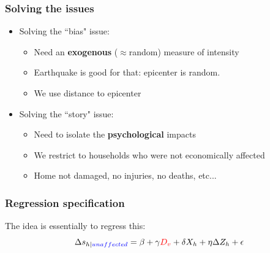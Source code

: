 \documentclass[aspectratio=169]{beamer}
\begin{document}
\begin{frame}
\frametitle{\LARGE{Solving the issues}}
\begin{itemize}
	\item Solving the ``bias" issue:
	\begin{itemize}
		\item Need an \textbf{exogenous} ($\approx$random) measure of intensity 
		\item Earthquake is good for that: epicenter is random. 
		\item We use distance to epicenter 
	\end{itemize}
	\item<2-> Solving the ``story" issue:
	\begin{itemize}
		\item Need to isolate the \textbf{psychological} impacts
		\item We restrict to households who were not economically affected  
		\item Home not damaged, no injuries, no deaths, etc...  
\end{itemize}

\end{itemize}
\end{frame}


\begin{frame}
	\frametitle{\LARGE{Regression specification}}
	The idea is essentially to regress this:
	\begin{equation}
	\Delta s_{h| \textcolor{blue}{unaffected}} = \beta + \gamma \textcolor{red}{D_v} + \delta X_h + \eta \Delta Z_h +  \epsilon
	\end{equation}
\end{frame}
\end{document}
